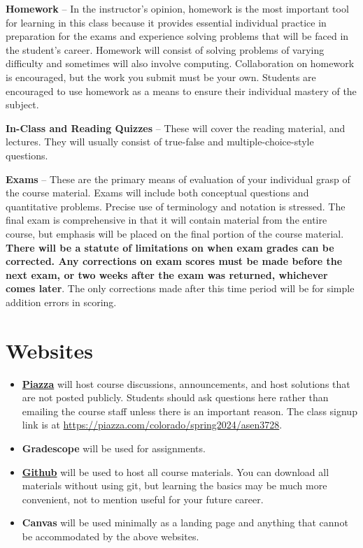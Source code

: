 \documentclass[9pt]{article}
\begin{document}
\textbf{Homework} -- In the instructor's opinion, homework is the most important tool for learning in this class because it provides essential individual practice in preparation for the exams and experience solving problems that will be faced in the student's career. Homework will consist of
solving problems of varying difficulty and sometimes will also involve
computing. Collaboration on homework is encouraged, but the work you submit must be your own. Students are encouraged to use homework as a means to ensure
their individual mastery of the subject.

\textbf{In-Class and Reading Quizzes} -- These will cover the reading material, and
lectures.  They will usually consist of true-false and multiple-choice-style questions.

\textbf{Exams} -- These are the primary means of evaluation of your
individual grasp of the course material. Exams will include both conceptual questions and
quantitative problems. Precise use of terminology and notation is
stressed. The final exam is comprehensive in that it will contain
material from the entire course, but emphasis will be placed on the
final portion of the course material. \textbf{There will
be a statute of limitations on when exam grades can be corrected. Any
corrections on exam scores must be made before the next exam, or two
weeks after the exam was returned, whichever comes later}. The only
corrections made after this time period will be for simple addition
errors in scoring.

\section*{Websites}

\begin{itemize}[nosep]
    \item \href{https://piazza.com}{\textbf{Piazza}} will host course discussions, announcements, and host solutions that are not posted publicly. Students should ask questions here rather than emailing the course staff unless there is an important reason. The class signup link is at \url{https://piazza.com/colorado/spring2024/asen3728}.
    \item \textbf{Gradescope} will be used for assignments.
    \item \href{https://github.com/zsunberg/Aircraft-Dynamics-Materials}{\textbf{Github}} will be used to host all course materials. You can download all materials without using git, but learning the basics may be much more convenient, not to mention useful for your future career.
    \item \textbf{Canvas} will be used minimally as a landing page and anything that cannot be accommodated by the above websites.
\end{itemize}
\end{document}
